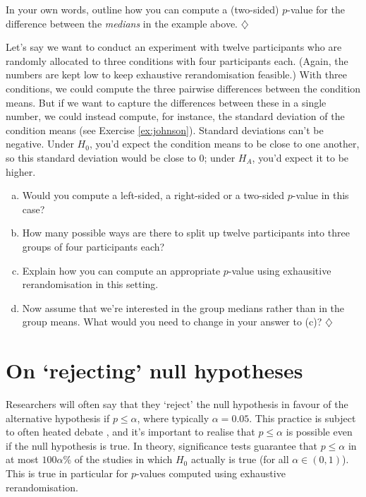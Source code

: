 \documentclass[a4paper]{tufte-book}\usepackage[]{graphicx}\usepackage[]{xcolor}
\newcommand*{\parend}[1][$\diamondsuit$]{%
\leavevmode\unskip\penalty9999 \hbox{}\nobreak\hfill
    \quad\hbox{#1}%
}
\begin{document}
  In your own words, outline how you can compute a (two-sided)
  $p$-value for the difference between the \emph{medians}
  in the example above.
\parend

  Let's say we want to conduct an experiment with
  twelve participants who are randomly allocated to
  three conditions with four participants each.
  (Again, the numbers are kept low to keep exhaustive
  rerandomisation feasible.)
  With three conditions, we could compute the 
  three pairwise differences between the condition means.
  But if we want to capture the differences between
  these in a single number, we could instead compute,
  for instance, the standard deviation of the condition means
  (see Exercise \vref{ex:johnson}).
  Standard deviations can't be negative.
  Under $H_0$, you'd expect the condition means to be close to one another,
  so this standard deviation would be close to $0$; 
  under $H_A$, you'd expect it to be higher.
  \begin{enumerate}[(a)]
    \item Would you compute a left-sided, a right-sided or a two-sided $p$-value in this case?
    \item How many possible ways are there to split up 
    twelve participants into three groups of four participants each?
    \item Explain how you can compute an appropriate $p$-value using
    exhausitive rerandomisation in this setting.
    \item Now assume that we're interested in the group medians rather 
    than in the group means. 
    What would you need to change in your answer to (c)?\parend
  \end{enumerate}
  
\section{On `rejecting' null hypotheses}
Researchers will often say that they `reject' the null hypothesis in
favour of the alternative hypothesis if $p \leq \alpha$, where typically $\alpha = 0.05$.
This practice is subject to often heated debate \citep[see][]{McShane2017},
and it's important to realise that $p \leq \alpha$ is possible
even if the null hypothesis is true.
In theory, 
significance tests guarantee that 
$p \leq \alpha$ in at most 
$100\alpha$\% of the studies in which 
$H_0$ actually is true (for all $\alpha \in (0, 1)$).
This is true in particular for $p$-values 
computed using exhaustive rerandomisation.
\end{document}
